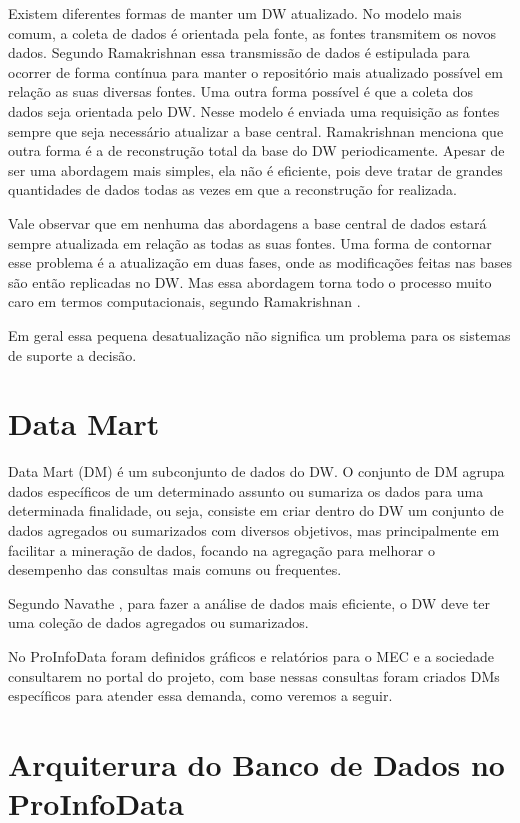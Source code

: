 Existem diferentes formas de manter um DW atualizado. No modelo mais
comum, a coleta de dados é orientada pela fonte, as fontes transmitem os novos 
dados. Segundo Ramakrishnan \cite{Rama} essa transmissão de dados é estipulada para
ocorrer de forma contínua para manter o repositório mais atualizado possível em
relação as suas diversas fontes. Uma outra forma possível é que a coleta dos
dados seja orientada pelo DW. Nesse modelo é enviada uma requisição as fontes
sempre que seja necessário atualizar a base central. Ramakrishnan \cite{Rama}
menciona que outra forma é a de reconstrução total da base do DW periodicamente.
Apesar de ser uma abordagem mais simples, ela não é eficiente, pois deve tratar
de grandes quantidades de dados todas as vezes em que a reconstrução for realizada.

Vale observar que em nenhuma das abordagens a base central de dados estará 
sempre atualizada em relação as todas as suas fontes. Uma forma de contornar esse
problema é a atualização em duas fases, onde as modificações feitas nas bases 
são então replicadas no DW. Mas essa abordagem torna todo o processo
muito caro em termos computacionais, segundo Ramakrishnan \cite{Rama}.

Em geral essa pequena desatualização não significa um problema para os sistemas
de suporte a decisão.

\section{\textbf{Data Mart}}

Data Mart (DM) é um subconjunto de dados do DW. O conjunto de DM agrupa dados
específicos de um determinado assunto ou sumariza os dados para uma determinada
finalidade, ou seja, consiste em criar dentro do DW um conjunto de dados
agregados ou sumarizados com diversos objetivos, mas principalmente em
facilitar a mineração de dados, focando na agregação para melhorar o desempenho
das consultas mais comuns ou frequentes.

Segundo Navathe \cite{Navathe}, para fazer a análise de dados mais eficiente,
o DW deve ter uma coleção de dados agregados ou sumarizados. 

No ProInfoData foram definidos gráficos e relatórios para o MEC e a sociedade
consultarem no portal do projeto, com base nessas consultas foram criados DMs
específicos para atender essa demanda, como veremos a seguir.

\section{\textbf{Arquiterura do Banco de Dados no ProInfoData}}

